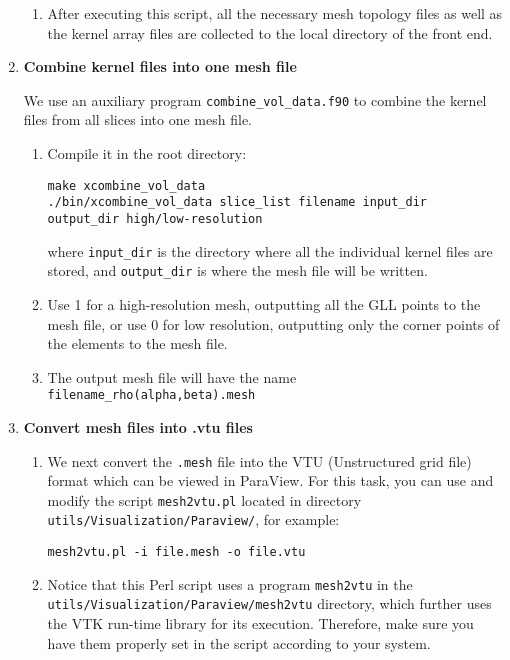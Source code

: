 \begin{enumerate}
\begin{enumerate}
\item After executing this script, all the necessary mesh topology files
as well as the kernel array files are collected to the local directory
of the front end.
\end{enumerate}
\item \textbf{Combine kernel files into one mesh file}


We use an auxiliary program \texttt{combine\_vol\_data.f90} to combine
the kernel files from all slices into one mesh file.
\begin{enumerate}
\item Compile it in the root directory:
{\footnotesize
\begin{verbatim}
make xcombine_vol_data
./bin/xcombine_vol_data slice_list filename input_dir output_dir high/low-resolution
\end{verbatim}
}
where \texttt{input\_dir} is the directory where all the individual
kernel files are stored, and \texttt{output\_dir} is where the mesh
file will be written.

\item Use 1 for a high-resolution mesh, outputting all the GLL points to
the mesh file, or use 0 for low resolution, outputting only the corner
points of the elements to the mesh file.
\item The output mesh file will have the name \texttt{filename\_rho(alpha,beta).mesh}
\end{enumerate}

\item \textbf{Convert mesh files into .vtu files}

\begin{enumerate}
\item We next convert the \texttt{.mesh} file into the VTU (Unstructured
grid file) format which can be viewed in ParaView. For this task,
you can use and modify the script \texttt{mesh2vtu.pl} located in
directory \texttt{utils/Visualization/Paraview/}, for example:

{\footnotesize
\begin{verbatim}
mesh2vtu.pl -i file.mesh -o file.vtu
\end{verbatim}
}

\item Notice that this Perl script uses a program \texttt{mesh2vtu} in the
\texttt{\small utils/Visualization/Paraview/mesh2vtu} directory, which further
uses the VTK  run-time library
for its execution. Therefore, make sure you have them properly set
in the script according to your system.
\end{enumerate}


\end{enumerate}
